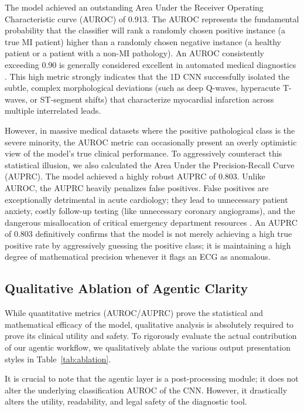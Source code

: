 \documentclass[10pt,twocolumn,letterpaper]{article}
\begin{document}
The model achieved an outstanding Area Under the Receiver Operating Characteristic curve (AUROC) of 0.913. The AUROC represents the fundamental probability that the classifier will rank a randomly chosen positive instance (a true MI patient) higher than a randomly chosen negative instance (a healthy patient or a patient with a non-MI pathology). An AUROC consistently exceeding 0.90 is generally considered excellent in automated medical diagnostics \cite{rajkomar2019machine}. This high metric strongly indicates that the 1D CNN successfully isolated the subtle, complex morphological deviations (such as deep Q-waves, hyperacute T-waves, or ST-segment shifts) that characterize myocardial infarction across multiple interrelated leads.

However, in massive medical datasets where the positive pathological class is the severe minority, the AUROC metric can occasionally present an overly optimistic view of the model's true clinical performance. To aggressively counteract this statistical illusion, we also calculated the Area Under the Precision-Recall Curve (AUPRC). The model achieved a highly robust AUPRC of 0.803. Unlike AUROC, the AUPRC heavily penalizes false positives. False positives are exceptionally detrimental in acute cardiology; they lead to unnecessary patient anxiety, costly follow-up testing (like unnecessary coronary angiograms), and the dangerous misallocation of critical emergency department resources \cite{rutten2020machine}. An AUPRC of 0.803 definitively confirms that the model is not merely achieving a high true positive rate by aggressively guessing the positive class; it is maintaining a high degree of mathematical precision whenever it flags an ECG as anomalous.

\subsection{Qualitative Ablation of Agentic Clarity}
While quantitative metrics (AUROC/AUPRC) prove the statistical and mathematical efficacy of the model, qualitative analysis is absolutely required to prove its clinical utility and safety. To rigorously evaluate the actual contribution of our agentic workflow, we qualitatively ablate the various output presentation styles in Table~\ref{tab:ablation}. 

It is crucial to note that the agentic layer is a post-processing module; it does not alter the underlying classification AUROC of the CNN. However, it drastically alters the utility, readability, and legal safety of the diagnostic tool.
\end{document}
